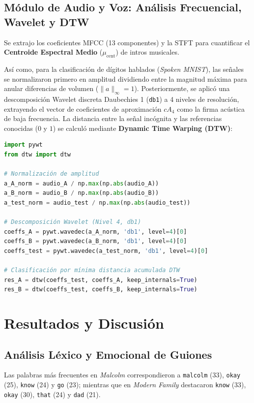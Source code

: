 \documentclass[12pt]{article}
\begin{document}
\subsection{Módulo de Audio y Voz: Análisis Frecuencial, Wavelet y DTW}
Se extrajo los coeficientes MFCC (13 componentes) y la STFT para cuantificar el \textbf{Centroide Espectral Medio} ($\mu_{\text{cent}}$) de intros musicales. 

Así como, para la clasificación de dígitos hablados (\textit{Spoken MNIST}), las señales se normalizaron primero en amplitud dividiendo entre la magnitud máxima para anular diferencias de volumen ($\|a\|_{\infty} = 1$). Posteriormente, se aplicó una descomposición Wavelet discreta Daubechies 1 (\texttt{db1}) a 4 niveles de resolución, extrayendo el vector de coeficientes de aproximación $cA_4$ como la firma acústica de baja frecuencia. La distancia entre la señal incógnita y las referencias conocidas ($0$ y $1$) se calculó mediante \textbf{Dynamic Time Warping (DTW)}:

\begin{lstlisting}[language=Python, caption={Normalización, descomposición Wavelet y clasificación DTW.}]
import pywt
from dtw import dtw

# Normalización de amplitud
a_A_norm = audio_A / np.max(np.abs(audio_A))
a_B_norm = audio_B / np.max(np.abs(audio_B))
a_test_norm = audio_test / np.max(np.abs(audio_test))

# Descomposición Wavelet (Nivel 4, db1)
coeffs_A = pywt.wavedec(a_A_norm, 'db1', level=4)[0]
coeffs_B = pywt.wavedec(a_B_norm, 'db1', level=4)[0]
coeffs_test = pywt.wavedec(a_test_norm, 'db1', level=4)[0]

# Clasificación por mínima distancia acumulada DTW
res_A = dtw(coeffs_test, coeffs_A, keep_internals=True)
res_B = dtw(coeffs_test, coeffs_B, keep_internals=True)
\end{lstlisting}

\section{Resultados y Discusión}

\subsection{Análisis Léxico y Emocional de Guiones}
Las palabras más frecuentes en \textit{Malcolm} correspondieron a \texttt{malcolm} (33), \texttt{okay} (25), \texttt{know} (24) y \texttt{go} (23); mientras que en \textit{Modern Family} destacaron \texttt{know} (33), \texttt{okay} (30), \texttt{that} (24) y \texttt{dad} (21).
\end{document}
